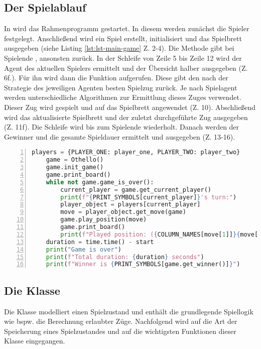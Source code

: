 \subsection{Der Spielablauf}
In  wird das Rahmenprogramm gestartet. In diesem werden zunächst die Spieler festgelegt. Anschließend wird ein Spiel erstellt, initialisiert und das Spielbrett ausgegeben (siehe Listing \ref{lst:lst-main-game} Z. 2-4). Die Methode  gibt bei Spielende , ansonsten  zurück. In der Schleife von Zeile 5 bis Zeile 12 wird der Agent des aktuellen Spielers ermittelt und der Übersicht halber ausgegeben (Z. 6f.). Für ihn wird dann die Funktion  aufgerufen. Diese gibt den nach der Strategie des jeweiligen Agenten besten Spielzug zurück. Je nach Spielagent werden unterschiedliche Algorithmen zur Ermittlung dieses Zuges verwendet. Dieser Zug wird gespielt und auf das Spielbrett angewendet (Z. 10). Abschließend wird das aktualisierte Spielbrett und der zuletzt durchgeführte Zug ausgegeben (Z. 11f). Die Schleife wird bis zum Spielende wiederholt. Danach werden der Gewinner und die gesamte Spieldauer ermittelt und ausgegeben (Z. 13-16). 
\begin{lstlisting}[basicstyle=\footnotesize, caption = {Spielablauf in \mxZitat{main-game.py}}, language = python, captionpos = t , numbers=left, label={lst:lst-main-game}]
    players = {PLAYER_ONE: player_one, PLAYER_TWO: player_two}
    game = Othello()
    game.init_game()
    game.print_board()
    while not game.game_is_over():
        current_player = game.get_current_player()
        print(f"{PRINT_SYMBOLS[current_player]}'s turn:")
        player_object = players[current_player]
        move = player_object.get_move(game)
        game.play_position(move)
        game.print_board()
        print(f"Played position: ({COLUMN_NAMES[move[1]]}{move[0] + 1})")
    duration = time.time() - start
    print("Game is over")
    print(f"Total duration: {duration} seconds")
    print(f"Winner is {PRINT_SYMBOLS[game.get_winner()]}")
\end{lstlisting}
\subsection{Die Klasse }
\label{ot1}
Die Klasse  modelliert einen Spielzustand und enthält die grundlegende Spiellogik wie bspw. die Berechnung erlaubter Züge. Nachfolgend wird auf die Art der Speicherung eines Spielzustandes und auf die wichtigsten Funktionen dieser Klasse eingegangen.
